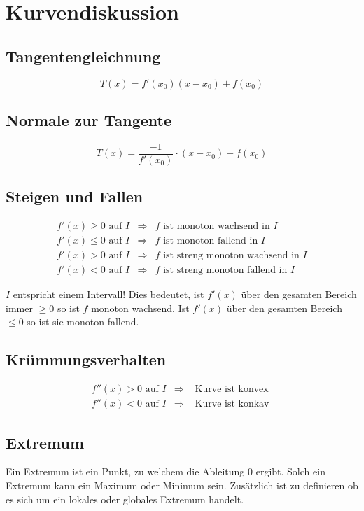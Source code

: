 \section{Kurvendiskussion}

\subsection{Tangentengleichnung}
\[ \boxed{T(x) = f'(x_0)(x - x_0) + f(x_0)} \]

\subsection{Normale zur Tangente}
\[ \boxed{ T(x) = \frac{-1}{f'(x_0)} \cdot (x-x_0) + f(x_0) } \]

\subsection{Steigen und Fallen}

\[ \boxed{ \begin{array}{lll}
f'(x) \geq 0 \text{ auf } I & \Rightarrow  & f \text{ ist monoton wachsend in $I$} \\
f'(x) \leq 0 \text{ auf } I & \Rightarrow  & f \text{ ist monoton fallend in $I$} \\
f'(x) > 0 \text{ auf } I & \Rightarrow  & f \text{ ist streng monoton wachsend in $I$} \\
f'(x) < 0 \text{ auf } I & \Rightarrow  & f \text{ ist streng monoton fallend in $I$}
\end{array} } \]

\noindent
$I$ entspricht einem Intervall! Dies bedeutet, ist $f'(x)$ über den gesamten Bereich immer $\geq 0$ so ist $f$ monoton wachsend.
Ist $f'(x)$ über den gesamten Bereich $\leq 0$ so ist sie monoton fallend.

\subsection{Krümmungsverhalten}

\[ \boxed{ \begin{matrix}
f''(x) > 0 \text{ auf } I & \Rightarrow  & \text{ Kurve ist konvex } \\
f''(x) < 0 \text{ auf } I & \Rightarrow  & \text{ Kurve ist konkav }
\end{matrix} } \]

\subsection{Extremum}
Ein Extremum ist ein Punkt, zu welchem die Ableitung $0$ ergibt.
Solch ein Extremum kann ein Maximum oder Minimum sein.
Zusätzlich ist zu definieren ob es sich um ein lokales oder globales Extremum handelt.

